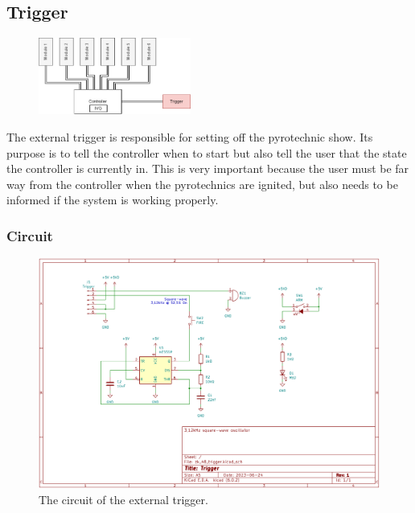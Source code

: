 \pagebreak

\subsection{Trigger}

\begin{figure}[!ht]
    \centering
    \includegraphics[width=5cm]{./Figures/concept_trigger.png} 
\end{figure}

\noindent The external trigger is responsible for setting off the pyrotechnic show. Its purpose is to tell the controller when to start but also tell the user that the state the controller is currently in. This is very important because the user must be far way from the controller when the pyrotechnics are ignited, but also needs to be informed if the system is working properly.

\subsubsection{Circuit}

\begin{figure}[!ht]
    \centering
    \includegraphics[width=15cm]{./Figures/trigger_circuit.png}
    \caption{The circuit of the external trigger.}
    \label{fig:trigger_circuit}     
\end{figure}

